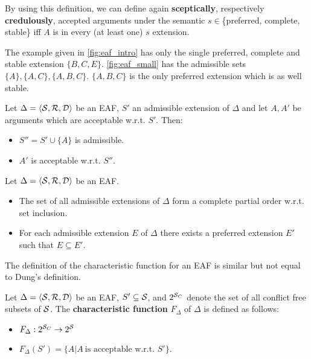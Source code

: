 By using this definition, we can define again \textbf{sceptically}, respectively \textbf{credulously}, accepted arguments under the semantic $ s \in $\{preferred, complete, stable\} iff $A$ is in every (at least one) $s$ extension. 
\begin{exa}
	The example given in \autoref{fig:eaf_intro} has only the single preferred, complete and stable extension $\{B, C, E\}$. \autoref{fig:eaf_small} has the admissible sets $\{A\}, \{A, C\}, \{A, B, C\}$. $\{A, B, C\}$ is the only preferred extension which is as well stable.
\end{exa}

\begin{lemma}
	Let $\Delta = \langle \S, \R, \D \rangle$ be an \gls{EAF}, $S'$ an admissible extension of $\Delta$ and let $A, A'$ be arguments which are acceptable w.r.t. $S'$. Then:
	\begin{itemize}
		\item $S'' = S' \cup \{A\}$ is admissible.
		\item $A'$ is acceptable w.r.t. $S''$.
	\end{itemize}	
\end{lemma}

\begin{lemma}
	Let $\Delta = \langle \S, \R, \D \rangle$ be an \gls{EAF}. 
	\begin{itemize}
		\item The set of all admissible extensions of $\Delta$ form a complete partial order w.r.t. set inclusion.
		\item For each admissible extension $E$ of $\Delta$ there exists a preferred extension $E'$ such that $E\subseteq E'$.
	\end{itemize}
	\label{lem:eaf:partialorder}
\end{lemma}

The definition of the characteristic function for an \gls{EAF} is similar but not equal to Dung's definition. 

\begin{definition}
	Let $\Delta = \langle \S, \R, \D \rangle$ be an \gls{EAF}, $S'\subseteq \S$, and $2^{\S_C}$ denote the set of all conflict free subsets of $\S$. The \textbf{characteristic function} $F_\Delta$ of $\Delta$ is defined as follows:
	\begin{itemize}
		\item $F_\Delta: 2^{\S_C} \rightarrow 2^{\S}$
		\item $F_\Delta(S') = \{A | A~\text{is acceptable w.r.t.~}S'\}$.
	\end{itemize}
\end{definition}

